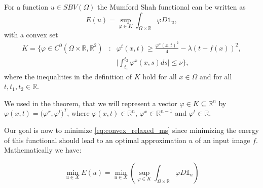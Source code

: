     \begin{theorem}
    \label{convex_relaxation_of_the_mumford_shah_functional}
        For a function $u \in SBV(\Omega)$ the Mumford Shah functional can be written as
            \begin{equation}
                E(u) = \sup_{\varphi \in K} \int_{\Omega \times \mathbb{R}} \varphi D\mathds{1}_{u}, \label{eq:convex_relaxed_ms}
            \end{equation}
        with a convex set
            \begin{eqnarray}
                K = \bigg\{ \varphi \in C^{0}(\Omega \times \mathbb{R}, \mathbb{R}^{2}) &:& \varphi^{t}(x, t) \ge \frac{\varphi^{x}(x,t)^{2}}{4} - \lambda(t - f(x))^{2}, \\
                &&\bigg| \int^{t_{2}}_{t_{1}} \varphi^{x}(x,s)ds \bigg| \le \nu \bigg\}, \label{eq:set_k_continuous}
            \end{eqnarray}
        where the inequalities in the definition of $K$ hold for all $x \in \Omega$ and for all $t, t_{1}, t_{2} \in \mathbb{R}$.
    \end{theorem}

    \begin{remark}
        We used in the theorem, that we will represent a vector $\varphi \in K \subseteq \mathbb{R}^{n}$ by $\varphi(x, t) = \big( \varphi^{x}, \varphi^{t} \big)^{T}$, where $\varphi(x,t) \in \mathbb{R}^{n}$, $\varphi^{x} \in \mathbb{R}^{n-1}$ and $\varphi^{t} \in \mathbb{R}$.
    \end{remark}

    Our goal is now to minimize \ref{eq:convex_relaxed_ms} since minimizing the energy of this functional should lead to an optimal approximation $u$ of an input image $f$. Mathematically we have:

    \begin{equation}
        \min_{u \in X} E(u) = \min_{u \in X} \left( \sup_{\varphi \in K} \int_{\Omega \times \mathbb{R}} \varphi D\mathds{1}_{u} \right) \label{eq:minimize_convex_relaxed_ms}
    \end{equation}

